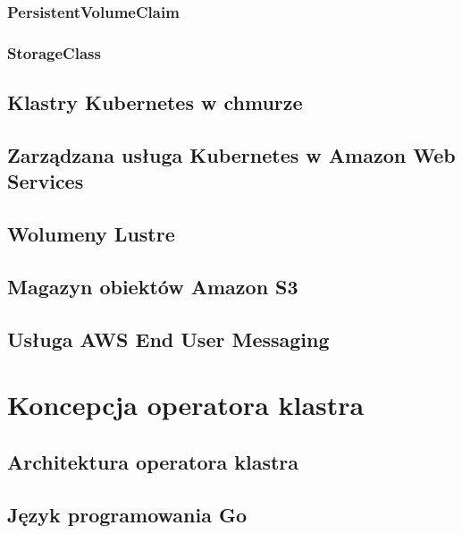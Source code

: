 \subsubsection{PersistentVolumeClaim}

\subsubsection{StorageClass}

\subsection{Klastry Kubernetes w chmurze}

\subsection{Zarządzana usługa Kubernetes w Amazon Web Services}

\subsection{Wolumeny Lustre}

\subsection{Magazyn obiektów Amazon S3}

\subsection{Usługa AWS End User Messaging}


\section{Koncepcja operatora klastra}

\subsection{Architektura operatora klastra}

\subsection{Język programowania Go}